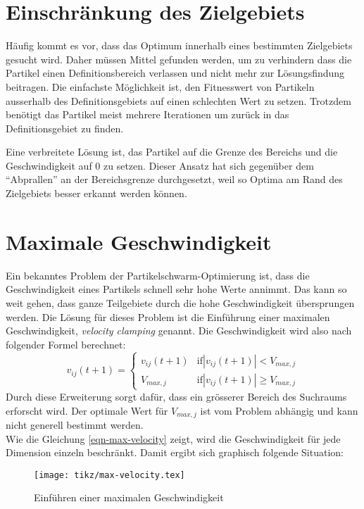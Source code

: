 \section{Einschränkung des Zielgebiets}
Häufig kommt es vor, dass das Optimum innerhalb eines bestimmten Zielgebiets gesucht wird. Daher müssen Mittel gefunden werden, um zu verhindern dass die Partikel einen Definitionsbereich verlassen und nicht mehr zur Lösungsfindung beitragen. Die einfachste Möglichkeit ist, den Fitnesswert von Partikeln ausserhalb des Definitionsgebiets auf einen schlechten Wert zu setzen. Trotzdem benötigt das Partikel meist mehrere Iterationen um zurück in das Definitionsgebiet zu finden.

Eine verbreitete Lösung ist, das Partikel auf die Grenze des Bereichs und die Geschwindigkeit auf 0 zu setzen. Dieser Ansatz hat sich gegenüber dem ``Abprallen'' an der Bereichsgrenze durchgesetzt, weil so Optima am Rand des Zielgebiets besser erkannt werden können.

\section{Maximale Geschwindigkeit}
Ein bekanntes Problem der Partikelschwarm-Optimierung ist, dass die Geschwindigkeit eines Partikels schnell sehr hohe Werte annimmt. Das kann so weit gehen, dass ganze Teilgebiete durch die hohe Geschwindigkeit übersprungen werden. Die Lösung für dieses Problem ist die Einführung einer maximalen Geschwindigkeit, \textit{velocity clamping} genannt. Die Geschwindigkeit wird also nach folgender Formel berechnet:
\begin{equation}
	v_{ij}(t+1) = 
	\begin{cases}
		v_{ij}(t+1) & \text{if} |v_{ij}(t+1)| < V_{max,j} \\
		V_{max,j} & \text{if} |v_{ij}(t+1)| \geq V_{max,j}
	\end{cases}
	\label{eqn-max-velocity}
\end{equation}
Durch diese Erweiterung sorgt dafür, dass ein grösserer Bereich des Suchraums erforscht wird. Der optimale Wert für $V_{max,j}$ ist vom Problem abhängig und kann nicht generell bestimmt werden. \\

Wie die Gleichung \ref{eqn-max-velocity} zeigt, wird die Geschwindigkeit für jede Dimension einzeln beschränkt. Damit ergibt sich graphisch folgende Situation:

\begin{figure}[htbp]
	\centering
	\texttt{[image: tikz/max-velocity.tex]}
	\caption{Einführen einer maximalen Geschwindigkeit}
	\label{fig-max-velocity}
\end{figure}

